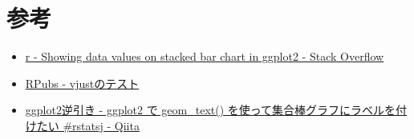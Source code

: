 \documentclass[]{book}
\providecommand{\tightlist}{%
  \setlength{\itemsep}{0pt}\setlength{\parskip}{0pt}}
\begin{document}
\section{参考}\label{-1}

\begin{itemize}
\tightlist
\item
  \href{http://stackoverflow.com/questions/6644997/showing-data-values-on-stacked-bar-chart-in-ggplot2}{r
  - Showing data values on stacked bar chart in ggplot2 - Stack
  Overflow}
\item
  \href{https://rpubs.com/kazutan/vjust_test}{RPubs - vjustのテスト}
\item
  \href{http://qiita.com/hoxo_m/items/267ce2ab0acc319599ff}{ggplot2逆引き
  - ggplot2 で geom\_text() を使って集合棒グラフにラベルを付けたい
  \#rstatsj - Qiita}
\end{itemize}
\end{document}

